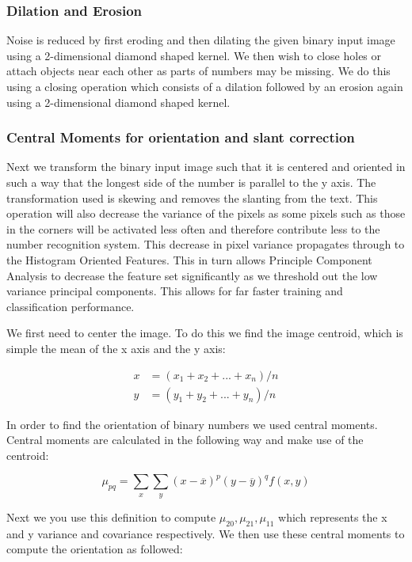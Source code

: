 \documentclass[%
        compressed,
        final,
        notitlepage,
        narroweqnarray,
        inline,
        twoside,
        ]{ieee}
\begin{document}
\subsubsection{Dilation and Erosion}

Noise is reduced by first eroding and then dilating the given binary input image
using a 2-dimensional diamond shaped kernel. We then wish to close holes or
attach objects near each other
as parts of numbers may be missing. We do this using a closing operation which
consists of a dilation followed by an erosion again using a 2-dimensional diamond shaped kernel.

\subsubsection{Central Moments for orientation and slant correction}
Next we transform the binary input image such that it is centered and oriented in such a way that the longest side of the number is parallel to the y axis. The transformation used is skewing and removes the slanting from the text. This operation will also decrease the variance of the pixels as some pixels such as those in the corners will be activated less often and therefore contribute less to the number recognition system. This decrease in pixel variance propagates through to the Histogram Oriented Features. This in turn allows Principle Component Analysis to decrease the feature set significantly as we threshold out the low variance principal components. This allows for far faster training and classification performance.

We first need to center the image. To do this we find the image centroid, which is simple the mean of the x axis and the y axis:

\begin{align}
    x&=(x_1+x_2+...+x_n)/n \\
    y&=(y_1+y_2+...+y_n)/n
\end{align}

In order to find the orientation of binary numbers we used central moments. Central moments are calculated in the following way and make use of the centroid:

\begin{equation}
    \mu_{pq} = \sum_x \sum_y (x - \overline{x})^p(y - \overline{y})^q f(x, y)
\end{equation}

 
Next we you use this definition to compute $\mu_{20}, \mu_{21}, \mu_{11}$ which represents the x and y variance and covariance respectively. We then use these central moments to compute the orientation as followed:
\end{document}

